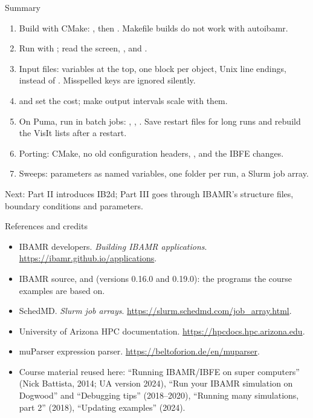 \documentclass[aspectratio=169,11pt]{beamer}
\begin{document}
\begin{frame}{Summary}
\begin{enumerate}\small
  \item Build with CMake: , then . Makefile builds do not work with autoibamr.
  \item Run with ; read the screen, , and .
  \item Input files: variables at the top, one block per object, Unix line endings,  instead of . Misspelled keys are ignored silently.
  \item {} and  set the cost; make output intervals scale with them.
  \item On Puma, run in batch jobs: , , . Save restart files for long runs and rebuild the VisIt lists after a restart.
  \item Porting: CMake, no old configuration headers, , and the IBFE changes.
  \item Sweeps: parameters as named variables, one folder per run, a Slurm job array.
\end{enumerate}
\vspace{2mm}
\begin{homebox}
\small Next: Part II introduces IB2d; Part III goes through IBAMR's structure files, boundary conditions and parameters.
\end{homebox}
\end{frame}

\begin{frame}{References and credits}
\small
\begin{itemize}
  \item IBAMR developers. \emph{Building IBAMR applications}. \url{https://ibamr.github.io/applications}.
  \item IBAMR source,  and  (versions 0.16.0 and 0.19.0): the programs the course examples are based on.
  \item SchedMD. \emph{Slurm job arrays}. \url{https://slurm.schedmd.com/job_array.html}.
  \item University of Arizona HPC documentation. \url{https://hpcdocs.hpc.arizona.edu}.
  \item muParser expression parser. \url{https://beltoforion.de/en/muparser}.
  \item Course material reused here: ``Running IBAMR/IBFE on super computers'' (Nick Battista, 2014; UA version 2024), ``Run your IBAMR simulation on Dogwood'' and ``Debugging tips'' (2018--2020), ``Running many simulations, part 2'' (2018), ``Updating examples'' (2024).
\end{itemize}
\end{frame}
\end{document}
